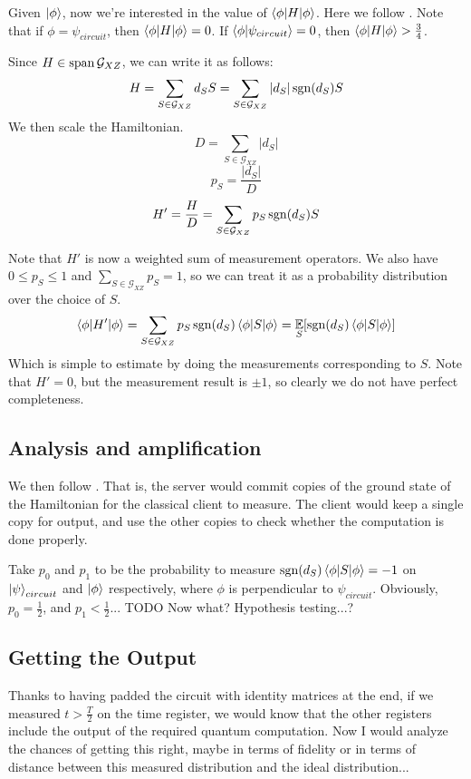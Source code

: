 Given $\ket\phi$, now we're interested in the value of $\braket{\phi|H|\phi}$. Here we follow \cite{PhysRevA.93.022326}. Note that if $\phi=\psi_{circuit}$, then $\braket{\phi|H|\phi}=0$. If $\braket{\phi|\psi_{circuit}}=0$, then $\braket{\phi|H|\phi}>\frac{3}{4}$.

Since $H\in\operatorname*{\operatorname{span}}\mathcal{G}_{XZ}$, we can write it as follows:
$$H=\sum_{S\in\mathcal{G}_{XZ}} d_S S= \sum_{S\in\mathcal{G}_{XZ}} |d_S|\operatorname{sgn}(d_S)S$$
We then scale the Hamiltonian.
$$D=\sum_{S\in\mathcal{G}_{XZ}}|d_S|$$
$$p_S=\frac{|d_S|}{D}$$
$$H'=\frac{H}{D}=\sum_{S\in\mathcal{G}_{XZ}} p_S\operatorname{sgn}(d_S)S$$

Note that $H'$ is now a weighted sum of measurement operators. We also have $0\leq p_S\leq1$ and $\sum_{S\in\mathcal{G}_{XZ}} p_S=1$, so we can treat it as a probability distribution over the choice of $S$.
$$\braket{\phi|H'|\phi}=\sum_{S\in\mathcal{G}_{XZ}} p_S\operatorname{sgn}(d_S)\braket{\phi|S|\phi}=\operatorname*{\mathbb{E}}_S[\operatorname{sgn}(d_S)\braket{\phi|S|\phi}]$$
Which is simple to estimate by doing the measurements corresponding to $S$.
Note that $H'=0$, but the measurement result is $\pm1$, so clearly we do not have perfect completeness.

\subsection{Analysis and amplification}

We then follow \cite{mahadev_delegation}. That is, the server would commit copies of the ground state of the Hamiltonian for the classical client to measure.
The client would keep a single copy for output, and use the other copies to check whether the computation is done properly.

Take $p_0$ and $p_1$ to be the probability to measure $\operatorname{sgn}(d_S)\braket{\phi|S|\phi}=-1$ on $\ket\psi_{circuit}$ and $\ket\phi$ respectively, where $\phi$ is perpendicular to $\psi_{circuit}$. Obviously, $p_0=\frac{1}{2}$, and $p_1<\frac{1}{2}$... TODO Now what? Hypothesis testing...?

\subsection{Getting the Output}

Thanks to having padded the circuit with identity matrices at the end, if we measured $t>\frac{T}{2}$ on the time register, we would know that the other registers include the output of the required quantum computation. Now I would analyze the chances of getting this right, maybe in terms of fidelity or in terms of distance between this measured distribution and the ideal distribution...
